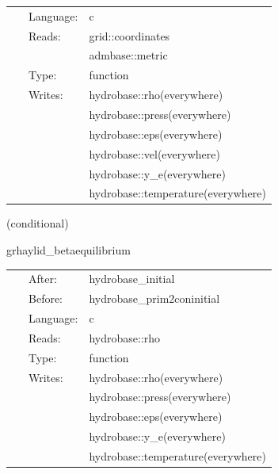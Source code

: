 \documentclass{article}
\begin{document}
\hspace{5mm}{\it set three-dimensional constant-density sphere initial data } 


\hspace{5mm}

 \begin{tabular*}{160mm}{cll} 
~ & Language:  & c \\ 
~ & Reads:  & grid::coordinates \\ 
~& ~ &admbase::metric\\ 
~ & Type:  & function \\ 
~ & Writes:  & hydrobase::rho(everywhere) \\ 
~& ~ &hydrobase::press(everywhere)\\ 
~& ~ &hydrobase::eps(everywhere)\\ 
~& ~ &hydrobase::vel(everywhere)\\ 
~& ~ &hydrobase::y\_e(everywhere)\\ 
~& ~ &hydrobase::temperature(everywhere)\\ 
\end{tabular*} 


\vspace{5mm}

   (conditional) 

\hspace{5mm} grhaylid\_betaequilibrium 

\hspace{5mm}{\it set beta-equilibrium primitives with a complete atmosphere density reset } 


\hspace{5mm}

 \begin{tabular*}{160mm}{cll} 
~ & After:  & hydrobase\_initial \\ 
~ & Before:  & hydrobase\_prim2coninitial \\ 
~ & Language:  & c \\ 
~ & Reads:  & hydrobase::rho \\ 
~ & Type:  & function \\ 
~ & Writes:  & hydrobase::rho(everywhere) \\ 
~& ~ &hydrobase::press(everywhere)\\ 
~& ~ &hydrobase::eps(everywhere)\\ 
~& ~ &hydrobase::y\_e(everywhere)\\ 
~& ~ &hydrobase::temperature(everywhere)\\ 
\end{tabular*} 
\end{document}
